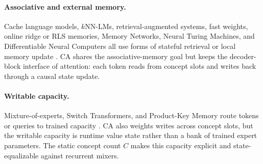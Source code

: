 \paragraph{Associative and external memory.}
Cache language models, $k$NN-LMs, retrieval-augmented systems, fast weights, online ridge or RLS memories, Memory Networks, Neural Turing Machines, and Differentiable Neural Computers all use forms of stateful retrieval or local memory update \citep{grave2017improving,khandelwal2020generalization,lewis2020retrieval,ba2016using,schlag2021linear,crammer2006online,weston2015memory,graves2014neural,graves2016hybrid}. CA shares the associative-memory goal but keeps the decoder-block interface of attention: each token reads from concept slots and writes back through a causal state update.

\paragraph{Writable capacity.}
Mixture-of-experts, Switch Transformers, and Product-Key Memory route tokens or queries to trained capacity \citep{shazeer2017outrageously,fedus2022switch,lample2019large}. CA also weights writes across concept slots, but the writable capacity is runtime value state rather than a bank of trained expert parameters. The static concept count $C$ makes this capacity explicit and state-equalizable against recurrent mixers.
